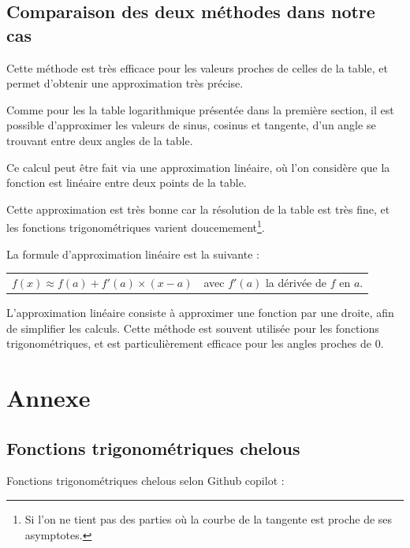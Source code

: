 \documentclass[a4paper]{article}
\begin{document}
\pagebreak

		\subsection*{Comparaison des deux méthodes dans notre cas}


			Cette méthode est très efficace pour les valeurs proches de celles de la table, 
			et permet d'obtenir une approximation très précise.

			Comme pour les la table logarithmique présentée dans la première section,
			il est possible d'approximer les valeurs de sinus, cosinus et tangente,
			d'un angle se trouvant entre deux angles de la table.

			Ce calcul peut être fait via une approximation linéaire,
			où l'on considère que la fonction est linéaire entre deux points de la table.

			Cette approximation est très bonne car la résolution de la table est très fine,
			et les fonctions trigonométriques varient doucemement\footnote{Si l'on ne tient pas des parties où la courbe de la tangente est proche de ses asymptotes.}.

			La formule d'approximation linéaire est la suivante :

			\begin{tabular}{ll}
				\large{$f(x) \approx f(a) + f'(a) \times (x - a)$} & \large{avec $f'(a)$ la dérivée de $f$ en $a$.}\\
			
			\end{tabular}
			
			L'approximation linéaire consiste à approximer une fonction par une droite, 
			afin de simplifier les calculs. Cette méthode est souvent utilisée pour les fonctions trigonométriques,
			et est particulièrement efficace pour les angles proches de $0$.

\newpage

	\section{Annexe}

		\subsection*{Fonctions trigonométriques chelous} \label{fonction_trigo_chelous}

		Fonctions trigonométriques chelous selon Github copilot :
\end{document}
